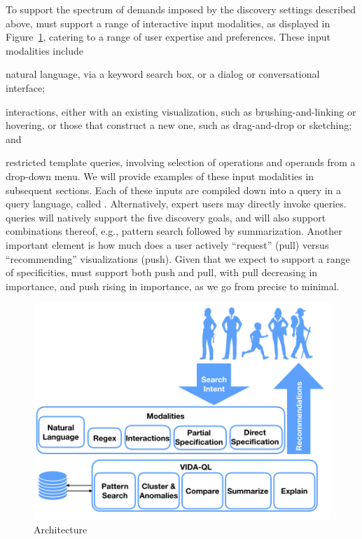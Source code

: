 \par
{} To support the spectrum of 
demands imposed by the
discovery settings described above, \vida 
must support a range of interactive input modalities,
as displayed in Figure~\ref{fig:vida_architecture},
catering to a range of user expertise and preferences.
These input modalities include 
\squishlist
	\item natural language, via a keyword search box, or a dialog or conversational interface;
	\item interactions, either with an existing visualization, such as brushing-and-linking or hovering, or those that construct a new one, such as drag-and-drop or sketching; and
	\item restricted template queries, involving selection of operations and operands from a drop-down menu.
\squishend
We will provide examples of these input modalities in subsequent sections.
Each of these inputs are compiled down
into a query in a query language, called \vidaql.
Alternatively, expert users may directly invoke \vidaql queries.
\vidaql queries will natively support the five discovery goals,
and will also support combinations thereof, e.g., pattern search followed by 
summarization. 
Another important element is how much does a user actively ``request'' (pull)
versus \vida ``recommending'' visualizations (push). 
Given that we expect \vida to support a range of specificities,
\vida must support both push and pull, with pull decreasing
in importance, and push rising in importance, as we go from precise to minimal.

\begin{figure}[h!]
\centering
\includegraphics[width=0.5\linewidth]{figures/VIDA_architecture.png}
\caption{\vida Architecture\label{fig:vida_architecture}
}
\end{figure}




